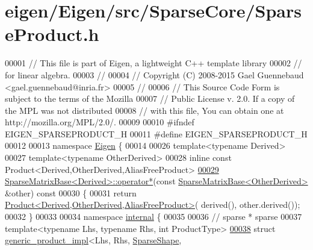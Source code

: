 \hypertarget{eigen_2_eigen_2src_2_sparse_core_2_sparse_product_8h_source}{}\section{eigen/\+Eigen/src/\+Sparse\+Core/\+Sparse\+Product.h}
\label{eigen_2_eigen_2src_2_sparse_core_2_sparse_product_8h_source}

\begin{DoxyCode}
00001 \textcolor{comment}{// This file is part of Eigen, a lightweight C++ template library}
00002 \textcolor{comment}{// for linear algebra.}
00003 \textcolor{comment}{//}
00004 \textcolor{comment}{// Copyright (C) 2008-2015 Gael Guennebaud <gael.guennebaud@inria.fr>}
00005 \textcolor{comment}{//}
00006 \textcolor{comment}{// This Source Code Form is subject to the terms of the Mozilla}
00007 \textcolor{comment}{// Public License v. 2.0. If a copy of the MPL was not distributed}
00008 \textcolor{comment}{// with this file, You can obtain one at http://mozilla.org/MPL/2.0/.}
00009 
00010 \textcolor{preprocessor}{#ifndef EIGEN\_SPARSEPRODUCT\_H}
00011 \textcolor{preprocessor}{#define EIGEN\_SPARSEPRODUCT\_H}
00012 
00013 \textcolor{keyword}{namespace }\hyperlink{namespace_eigen}{Eigen} \{ 
00014 
00026 \textcolor{keyword}{template}<\textcolor{keyword}{typename} Derived>
00027 \textcolor{keyword}{template}<\textcolor{keyword}{typename} OtherDerived>
00028 \textcolor{keyword}{inline} \textcolor{keyword}{const} Product<Derived,OtherDerived,AliasFreeProduct>
\hyperlink{group___sparse_core___module_a9d4d71b3f34389e6fc01f2b86e43f7a4}{00029} \hyperlink{group___sparse_core___module_class_eigen_1_1_sparse_matrix_base}{SparseMatrixBase<Derived>::operator*}(\textcolor{keyword}{const} 
      \hyperlink{group___sparse_core___module_class_eigen_1_1_sparse_matrix_base}{SparseMatrixBase<OtherDerived>} &other)\textcolor{keyword}{ const}
00030 \textcolor{keyword}{}\{
00031   \textcolor{keywordflow}{return} \hyperlink{group___core___module_class_eigen_1_1_product}{Product<Derived,OtherDerived,AliasFreeProduct>}(
      derived(), other.derived());
00032 \}
00033 
00034 \textcolor{keyword}{namespace }\hyperlink{namespaceinternal}{internal} \{
00035 
00036 \textcolor{comment}{// sparse * sparse}
00037 \textcolor{keyword}{template}<\textcolor{keyword}{typename} Lhs, \textcolor{keyword}{typename} Rhs, \textcolor{keywordtype}{int} ProductType>
\hyperlink{struct_eigen_1_1internal_1_1generic__product__impl_3_01_lhs_00_01_rhs_00_01_sparse_shape_00_01_s0f15bf86456099378e4a76f37323e721}{00038} \textcolor{keyword}{struct }\hyperlink{struct_eigen_1_1internal_1_1generic__product__impl}{generic\_product\_impl}<Lhs, Rhs, \hyperlink{struct_eigen_1_1_sparse_shape}{SparseShape}, 

\end{DoxyCode}
